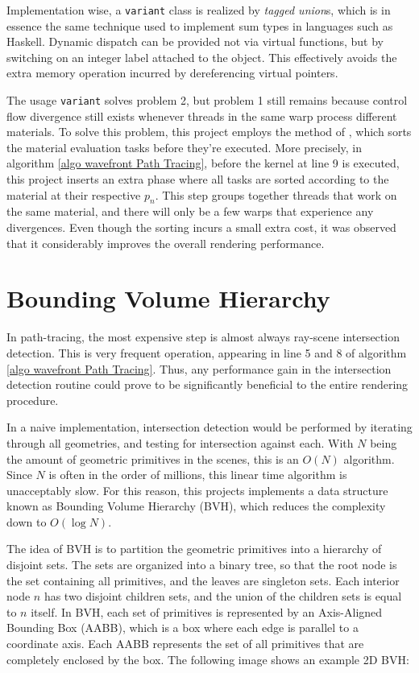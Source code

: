 Implementation wise, a \texttt{variant} class is realized by \textit{tagged union}s, which is in essence the same technique used to implement sum types in languages such as Haskell. Dynamic dispatch can be provided not via virtual functions, but by switching on an integer label attached to the object. This effectively avoids the extra memory operation incurred by dereferencing virtual pointers.

The usage \texttt{variant} solves problem 2, but problem 1 still remains because control flow divergence still exists whenever threads in the same warp process different materials. To solve this problem, this project employs the method of \cite{megakernel}, which sorts the material evaluation tasks before they're executed. More precisely, in algorithm \ref{algo wavefront Path Tracing}, before the kernel at line 9 is executed, this project inserts an extra phase where all tasks are sorted according to the material at their respective $p_n$. This step groups together threads that work on the same material, and there will only be a few warps that experience any divergences. Even though the sorting incurs a small extra cost, it was observed that it considerably improves the overall rendering performance.



\section{Bounding Volume Hierarchy}
In path-tracing, the most expensive step is almost always ray-scene intersection detection. This is very frequent operation, appearing in line 5 and 8 of algorithm \ref{algo wavefront Path Tracing}. Thus, any performance gain in the intersection detection routine could prove to be significantly beneficial to the entire rendering procedure. 

In a naive implementation, intersection detection would be performed by iterating through all geometries, and testing for intersection against each. With $N$ being the amount of geometric primitives in the scenes, this is an $O(N)$ algorithm. Since $N$ is often in the order of millions, this linear time algorithm is unacceptably slow. For this reason, this projects implements a data structure known as Bounding Volume Hierarchy (BVH), which reduces the complexity down to $O(\log N)$.

The idea of BVH is to partition the geometric primitives into a hierarchy of disjoint sets. The sets are organized into a binary tree, so that the root node is the set containing all primitives, and the leaves are singleton sets. Each interior node $n$ has two disjoint children sets, and the union of the children sets is equal to $n$ itself. In BVH, each set of primitives is represented by an Axis-Aligned Bounding Box (AABB), which is a box where each edge is parallel to a coordinate axis. Each AABB represents the set of all primitives that are completely enclosed by the box. The following image shows an example 2D BVH:

